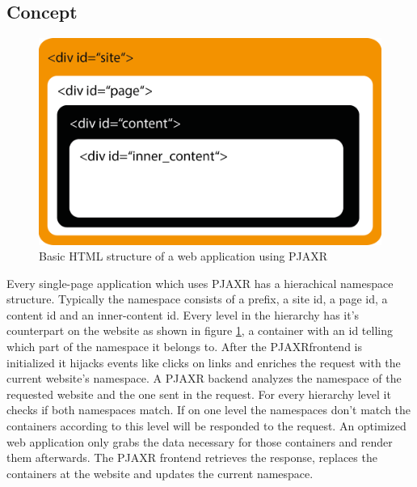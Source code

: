\documentclass[f,bachelor,binding,twoside,palatino]{WeSTthesis}
\def \pjaxr {PJAXR}
\def \singlePageApplication {single-page application}
\begin{document}
  \subsection{Concept}

  \begin{figure}[H]
    \centering
    \includegraphics[width=13cm]{images/pjaxr_html.png}
    \caption[pjaxr_html]{Basic HTML structure of a web application using \pjaxr{}}
    \label{fig:pjaxr_html}
  \end{figure}

  Every \singlePageApplication{} which uses \pjaxr{} has a hierachical namespace structure.
  Typically the namespace consists of a prefix, a site id, a page id, a content id and an inner-content id.
  Every level in the hierarchy has it's counterpart on the website as shown in figure \ref{fig:pjaxr_html}, a container with an id telling which part of the namespace it belongs to.
  After the \pjaxr frontend is initialized it hijacks events like clicks on links and enriches the request with the current website's namespace.
  A \pjaxr{} backend analyzes the namespace of the requested website and the one sent in the request.
  For every hierarchy level it checks if both namespaces match.
  If on one level the namespaces don't match the containers according to this level will be responded to the request.
  An optimized web application only grabs the data necessary for those containers and render them afterwards.
  The \pjaxr{} frontend retrieves the response, replaces the containers at the website and updates the current namespace.
  
\end{document}
